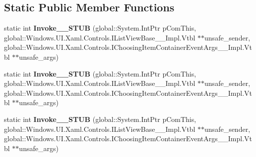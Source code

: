 \subsection*{Static Public Member Functions}
\begin{DoxyCompactItemize}
\item 
\mbox{\label{struct_windows_1_1_foundation_1_1_typed_event_handler___a___windows___u_i___xaml___controls___li81aac31d5f7498ed4eec5cad5e67da4e_ada08b8879752135a4b1d10c1e7b46a18}} 
static int {\bfseries Invoke\+\_\+\+\_\+\+S\+T\+UB} (global\+::\+System.\+Int\+Ptr p\+Com\+This, global\+::\+Windows.\+U\+I.\+Xaml.\+Controls.\+I\+List\+View\+Base\+\_\+\+\_\+\+Impl.\+Vtbl $\ast$$\ast$unsafe\+\_\+sender, global\+::\+Windows.\+U\+I.\+Xaml.\+Controls.\+I\+Choosing\+Item\+Container\+Event\+Args\+\_\+\+\_\+\+Impl.\+Vtbl $\ast$$\ast$unsafe\+\_\+args)
\item 
\mbox{\label{struct_windows_1_1_foundation_1_1_typed_event_handler___a___windows___u_i___xaml___controls___li81aac31d5f7498ed4eec5cad5e67da4e_ada08b8879752135a4b1d10c1e7b46a18}} 
static int {\bfseries Invoke\+\_\+\+\_\+\+S\+T\+UB} (global\+::\+System.\+Int\+Ptr p\+Com\+This, global\+::\+Windows.\+U\+I.\+Xaml.\+Controls.\+I\+List\+View\+Base\+\_\+\+\_\+\+Impl.\+Vtbl $\ast$$\ast$unsafe\+\_\+sender, global\+::\+Windows.\+U\+I.\+Xaml.\+Controls.\+I\+Choosing\+Item\+Container\+Event\+Args\+\_\+\+\_\+\+Impl.\+Vtbl $\ast$$\ast$unsafe\+\_\+args)
\item 
\mbox{\label{struct_windows_1_1_foundation_1_1_typed_event_handler___a___windows___u_i___xaml___controls___li81aac31d5f7498ed4eec5cad5e67da4e_ada08b8879752135a4b1d10c1e7b46a18}} 
static int {\bfseries Invoke\+\_\+\+\_\+\+S\+T\+UB} (global\+::\+System.\+Int\+Ptr p\+Com\+This, global\+::\+Windows.\+U\+I.\+Xaml.\+Controls.\+I\+List\+View\+Base\+\_\+\+\_\+\+Impl.\+Vtbl $\ast$$\ast$unsafe\+\_\+sender, global\+::\+Windows.\+U\+I.\+Xaml.\+Controls.\+I\+Choosing\+Item\+Container\+Event\+Args\+\_\+\+\_\+\+Impl.\+Vtbl $\ast$$\ast$unsafe\+\_\+args)
\item 

\end{DoxyCompactItemize}
